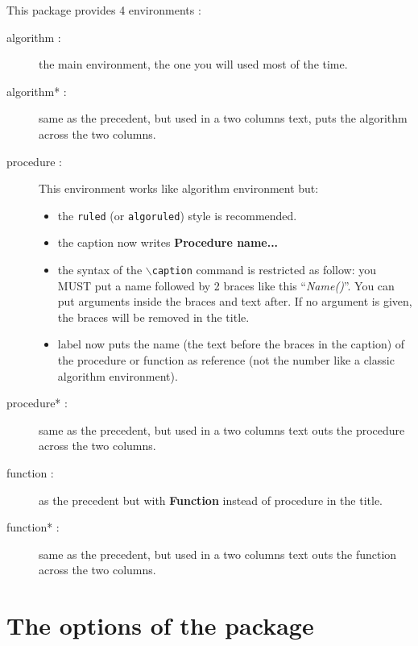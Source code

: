 \documentclass[a4paper]{article}
\begin{document}
This package provides 4 environments :
\begin{description}
\item[algorithm :] the main environment, the one you will used most of the
  time. 
\item[algorithm* :] same as the precedent, but used in a two columns text, puts
  the algorithm across the two columns.
\item[procedure :] This environment works like algorithm environment but:
  \begin{itemize}
  \item the \texttt{ruled} (or \texttt{algoruled}) style is recommended.
  \item the caption now writes \textbf{Procedure name...}
  \item the syntax of the $\backslash$\texttt{caption} command is restricted as
    follow: you MUST put a name followed by 2 braces like this
    ``\emph{Name()}''.  You can put arguments inside the braces and text after.
    If no argument is given, the braces will be removed in the title.
  \item label now puts the name (the text before the braces in the caption) of
    the procedure or function as reference (not the number like a classic
    algorithm environment).
  \end{itemize}
\item[procedure* :] same as the precedent, but used in a two columns text outs the
  procedure across the two columns.
\item[function :] as the precedent but with \textbf{Function} instead of
  procedure in the title.
\item[function* :] same as the precedent, but used in a two columns text outs the
  function across the two columns.
\end{description}


\section{The options of the package\label{sec_options}}
\end{document}
